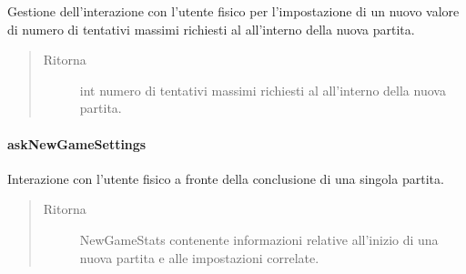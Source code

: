 \documentclass[letterpaper,10pt,italian,openany,oneside]{sphinxmanual}
\begin{document}
\begin{fulllineitems}
\label{\detokenize{source/it/unicam/cs/pa/mastermind/ui/StartView:it.unicam.cs.pa.mastermind.ui.StartView.askNewAttempts()}}
Gestione dell’interazione con l’utente fisico per l’impostazione di un nuovo valore di numero di tentativi massimi richiesti al  all’interno della nuova partita.
\begin{quote}\begin{description}
\item[{Ritorna}] \leavevmode
int numero di tentativi massimi richiesti al  all’interno della nuova partita.

\end{description}\end{quote}

\end{fulllineitems}



\paragraph{askNewGameSettings}
\label{\detokenize{source/it/unicam/cs/pa/mastermind/ui/StartView:asknewgamesettings}}

\begin{fulllineitems}
\label{\detokenize{source/it/unicam/cs/pa/mastermind/ui/StartView:it.unicam.cs.pa.mastermind.ui.StartView.askNewGameSettings()}}
Interazione con l’utente fisico a fronte della conclusione di una singola partita.
\begin{quote}\begin{description}
\item[{Ritorna}] \leavevmode
NewGameStats contenente informazioni relative all’inizio di una nuova partita e alle impostazioni correlate.

\end{description}\end{quote}

\end{fulllineitems}
\end{document}
